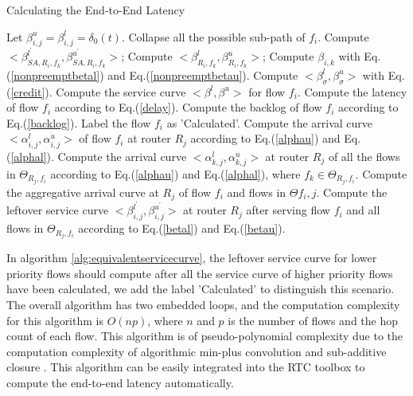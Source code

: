 \documentclass[10pt,journal]{IEEEtran}
\begin{document}
\begin{algorithm}
\caption{Calculating the End-to-End Latency}
\label{alg:equivalentservicecurve}
\begin{algorithmic}[1]
            \STATE Let $\beta_{i,j}^u=\beta_{i,j}^l=\delta_0(t)$.
        \ENDFOR
    \ENDFOR
        \STATE Collapse all the possible sub-path of $f_i$.
                \STATE Compute $<\beta_{SA,R_i,f_k}^{l^\prime},\beta_{SA,R_i,f_k}^{u^\prime}>$;
                \STATE Compute $<\beta_{R_i,f_k}^l,\beta_{R_i,f_k}^u>$;
                \ENDFOR
            \ENDIF
                \STATE Compute $\beta_{i,k}$ with Eq.(\ref{nonpreemptbetal}) and Eq.(\ref{nonpreemptbetau}).
            \ENDIF
        \ENDFOR
        \STATE Compute $<\beta_\sigma^l,\beta_\sigma^u>$ with Eq.(\ref{credit}).
        \STATE Compute the service curve $<\beta^l,\beta^u>$ for flow $f_i$.
        \STATE Compute the latency of flow $f_i$ according to Eq.(\ref{delay}).
        \STATE Compute the backlog of flow $f_i$ according to Eq.(\ref{backlog}).
        \STATE Label the flow $f_i$ as 'Calculated'.
                \STATE Compute the arrival curve $<\alpha^l_{i,j},\alpha^u_{i,j}>$ of flow $f_i$ at router $R_j$ according to Eq.(\ref{alphau}) and Eq.(\ref{alphal}).
                \STATE Compute the arrival curve $<\alpha^l_{k,j},\alpha^u_{k,j}>$ at router $R_j$ of all the flows in $\Theta_{R_j,f_i}$ according to Eq.(\ref{alphau}) and Eq.(\ref{alphal}), where $f_k\in\Theta_{R_j,f_i}$.
                \STATE Compute the aggregative arrival curve at $R_j$ of  flow $f_i$ and flows in $\Theta{f_i,j}$.
                \STATE Compute the leftover service curve $<\beta^{l^\prime}_{i,j},\beta^{u^\prime}_{i,j}>$ at router $R_j$ after serving flow $f_i$ and all flows in $\Theta_{R_j,f_i}$ according to Eq.(\ref{betal}) and Eq.(\ref{betau}).
            \ENDIF
        \ENDFOR
    \ENDFOR
\end{algorithmic}
\end{algorithm}

In algorithm \ref{alg:equivalentservicecurve}, the leftover service curve for lower priority flows should compute after all the service curve of higher priority flows have been calculated, we add the label 'Calculated' to distinguish this scenario. The overall algorithm has two embedded loops, and the computation complexity for this algorithm is $O(np)$, where $n$ and $p$ is the number of flows and the hop count of each flow. This algorithm is of pseudo-polynomial complexity due to the computation complexity of algorithmic min-plus convolution and sub-additive closure \cite{Bouillard2008}. This algorithm can be easily integrated into the RTC toolbox\cite{rtc} to compute the end-to-end latency automatically.
\end{document}
